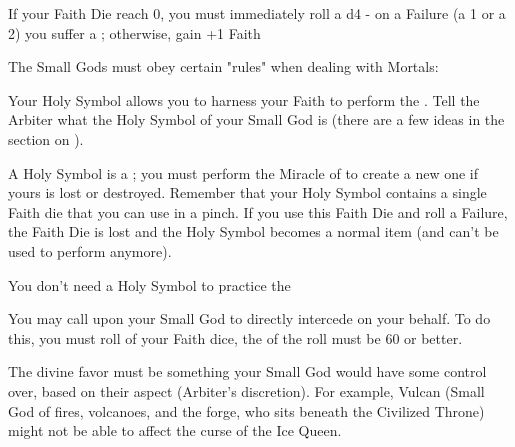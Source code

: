 {If your Faith Die reach 0, you must immediately roll a d4 - on a Failure (a 1 or a 2) you suffer a ; otherwise, gain +1 Faith \UD


The Small Gods must obey certain "rules" when dealing with Mortals:



Your Holy Symbol allows you to harness your Faith to perform the .  Tell the Arbiter what the Holy Symbol of your Small God is (there are a few ideas in the section on ).

A Holy Symbol is a ; you must perform the Miracle of  to create a new one if yours is lost or destroyed.  Remember that your Holy Symbol contains a single Faith die that you can use in a pinch.  If you use this Faith Die and roll a Failure, the Faith Die is lost and the Holy Symbol becomes a normal item (and can't be used to perform  anymore).

You don't need a Holy Symbol to practice the 

\newpage


You may call upon your Small God to directly intercede on your behalf.  To do this, you must roll  of your Faith dice, the \SUMDICE of the roll must be 60 or better.

The divine favor must be something your Small God would have some control over, based on their aspect (Arbiter's discretion).  For example, Vulcan (Small God of fires, volcanoes, and the forge, who sits beneath the Civilized Throne) might not be able to affect the curse of the Ice Queen.  

}
